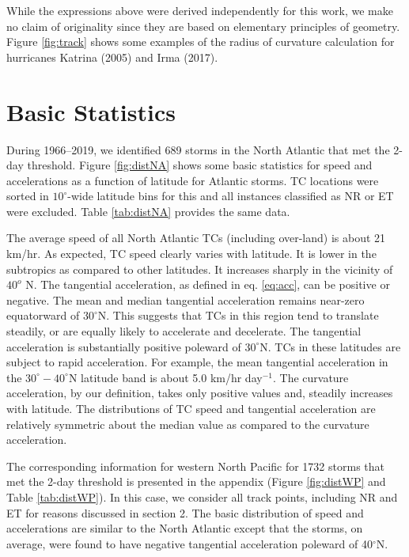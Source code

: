 \documentclass[wcd,manuscript]{copernicus}
\begin{document}
While the expressions above were derived independently for this work, we make no claim of originality since they are based on elementary principles of geometry. Figure \ref{fig:track} shows some examples of the radius of curvature calculation for hurricanes Katrina (2005) and Irma (2017). 

\section{Basic Statistics}

During 1966--2019, we identified 689 storms in the North Atlantic that met the 2-day threshold. Figure \ref{fig:distNA} shows some basic statistics for speed and accelerations as a function of latitude for Atlantic storms. TC locations were sorted in $10^\circ$-wide latitude bins for this and all instances classified as NR or ET were excluded. Table \ref{tab:distNA} provides the same data. 


The average speed of all North Atlantic TCs (including over-land) is about 21 km/hr. As expected, TC speed clearly varies with latitude. It is lower in the subtropics as compared to other latitudes. It increases sharply in the vicinity of $40^{o}$ N. The tangential acceleration, as defined in eq. \ref{eq:acc}, can be positive or negative. The mean and median tangential acceleration remains near-zero equatorward of $30^\circ$N. This suggests that TCs in this region tend to translate steadily, or are equally likely to accelerate and decelerate. The tangential acceleration is substantially positive poleward of $30^\circ$N. TCs in these latitudes are subject to rapid acceleration. For example, the mean tangential acceleration in the $30^\circ-40^\circ$N latitude band is about 5.0  km/hr day$^{-1}$.  The curvature acceleration, by our definition, takes only positive values and, steadily increases with latitude. The distributions of TC speed and tangential acceleration are relatively symmetric about the median value as compared to the curvature acceleration.


The corresponding information for western North Pacific for 1732 storms that met the 2-day threshold is presented in the appendix (Figure \ref{fig:distWP} and Table \ref{tab:distWP}). In this case, we consider all track points, including NR and ET for reasons discussed in section 2. The basic distribution of speed and accelerations are similar to the North Atlantic except that the storms, on average, were found to have negative tangential acceleration poleward of 40$^\circ$N.
\end{document}

